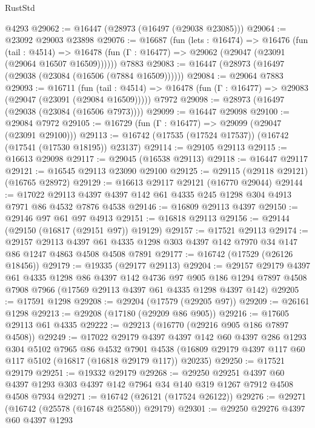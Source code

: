 \begin{lexlean}{RustStd}
\begin{coremodule}
    @4293
@29062 := @16447 (@28973 (@16497 (@29038 @23085)))
@29064 := @23092 @29003 @23898
@29076 := @16687
    (fun (lets : @16474) =>
    @16476
      (fun (tail : @4514) =>
      @16478 (fun (Γ : @16477) => @29062 (@29047 (@23091 (@29064 @16507 @16509))))))
    @7883
@29083 := @16447 (@28973 (@16497 (@29038 (@23084 (@16506 (@7884 @16509))))))
@29084 := @29064 @7883
@29093 := @16711
    (fun (tail : @4514) => @16478 (fun (Γ : @16477) => @29083 (@29047 (@23091 (@29084 @16509)))))
    @7972
@29098 := @28973 (@16497 (@29038 (@23084 (@16506 @7973))))
@29099 := @16447 @29098
@29100 := @29084 @7972
@29105 := @16729 (fun (Γ : @16477) => @29099 (@29047 (@23091 @29100)))
@29113 := @16742 (@17535 (@17524 @17537)) (@16742 (@17541 (@17530 @18195)) @23137)
@29114 := @29105 @29113
@29115 := @16613 @29098
@29117 := @29045 (@16538 @29113)
@29118 := @16447 @29117
@29121 := @16545 @29113 @23090 @29100
@29125 := @29115 (@29118 @29121) (@16765 @28972)
@29129 := @16613 @29117 @29121 (@16770 @29044)
@29144 := @17022 @29113 @4397 @4397 @142 @61 @4335 @245 @1298 @304 @4913 @7971 @86 @4532 @7876 @4538
@29146 := @16809 @29113 @4397
@29150 := @29146 @97 @61 @97 @4913
@29151 := @16818 @29113
@29156 := @29144 (@29150 (@16817 (@29151 @97)) @19129)
@29157 := @17521 @29113
@29174 := @29157
    @29113
    @4397
    @61
    @4335
    @1298
    @303
    @4397
    @142
    @7970
    @34
    @147
    @86
    @1247
    @4863
    @4508
    @4508
    @7891
@29177 := @16742 (@17529 (@26126 @18456))
@29179 := @19335 (@29177 @29113)
@29204 := @29157
    @29179
    @4397
    @61
    @4335
    @1298
    @86
    @4397
    @142
    @4736
    @97
    @905
    @186
    @1294
    @7897
    @4508
    @7908
    @7966
    (@17569 @29113 @4397 @61 @4335 @1298 @4397 @142)
@29205 := @17591 @1298
@29208 := @29204 (@17579 (@29205 @97))
@29209 := @26161 @1298
@29213 := @29208 (@17180 (@29209 @86 @905))
@29216 := @17605 @29113 @61 @4335
@29222 := @29213 (@16770 (@29216 @905 @186 @7897 @4508))
@29249 := @17022
    @29179
    @4397
    @4397
    @142
    @60
    @4397
    @286
    @1293
    @304
    @5102
    @7965
    @86
    @4532
    @7901
    @4538
    (@16809 @29179 @4397 @117 @60 @117 @5102 (@16817 (@16818 @29179 @117)) @20235)
@29250 := @17521 @29179
@29251 := @19332 @29179
@29268 := @29250
    @29251
    @4397
    @60
    @4397
    @1293
    @303
    @4397
    @142
    @7964
    @34
    @140
    @319
    @1267
    @7912
    @4508
    @4508
    @7934
@29271 := @16742 (@26121 (@17524 @26122))
@29276 := @29271 (@16742 (@25578 (@16748 @25580)) @29179)
@29301 := @29250
    @29276
    @4397
    @60
    @4397
    @1293

\end{coremodule}
\end{lexlean}
